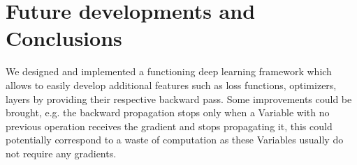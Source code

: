\documentclass[10pt,conference,compsocconf]{IEEEtran}
\begin{document}
\section{Future developments and Conclusions}
We designed and implemented a functioning deep learning framework which allows to easily develop additional features such as loss functions, optimizers, layers by providing their respective backward pass. Some improvements could be brought, e.g. the backward propagation stops only when a Variable with no previous operation receives the gradient and stops propagating it, this could potentially correspond to a waste of computation as these Variables usually do not require any gradients.
\end{document}
